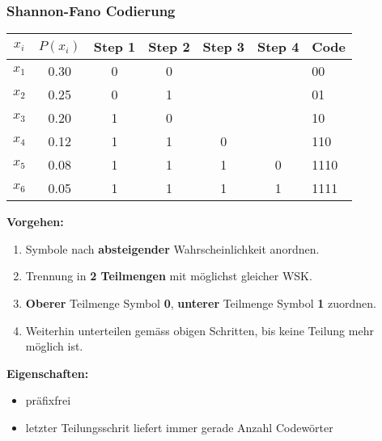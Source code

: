\subsubsection{Shannon-Fano Codierung}
\begin{multicols}{2}
	\begin{tabular}{|c|c|c|c|c|c|l|}
		\hline
		$x_i$	& $P(x_i)$ 	& Step 1	& Step 2	& Step 3 	& Step 4 	& Code \\
		\hline
		$x_1$	& 0.30		& 0			& 0			& 			&			& 00 \\
		\cline{4-4}
		$x_2$	& 0.25		& 0			& 1			& 			& 			& 01 \\
		\cline{3-4}
		$x_3$	& 0.20		& 1			& 0			& 			& 			& 10 \\
		\cline{4-5}
		$x_4$	& 0.12		& 1			& 1			& 0			& 			& 110 \\
		\cline{5-6}
		$x_5$	& 0.08		& 1			& 1			& 1			& 0			& 1110 \\
		\cline{6-6}		
		$x_6$	& 0.05		& 1			& 1			& 1			& 1			& 1111 \\
		\hline 
	\end{tabular}
	
	\columnbreak
	
	\textbf{Vorgehen:}
	\begin{enumerate}
		\item Symbole nach \textbf{absteigender} Wahrscheinlichkeit anordnen.
		\item Trennung in \textbf{2 Teilmengen} mit möglichst gleicher WSK.
		\item \textbf{Oberer} Teilmenge Symbol \textbf{0}, \textbf{unterer} Teilmenge Symbol \textbf{1}
		  zuordnen.
		\item Weiterhin unterteilen gemäss obigen Schritten, bis keine Teilung mehr möglich ist.
	\end{enumerate}
	
	\textbf{Eigenschaften:}
	\begin{itemize}
  		\item präfixfrei
  		\item letzter Teilungsschrit liefert immer gerade Anzahl Codewörter 
	\end{itemize}
\end{multicols}



